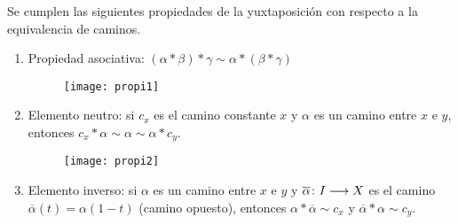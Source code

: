 \documentclass[GTS.tex]{subfiles}
\begin{document}
\begin{prop} Se cumplen las siguientes propiedades de la yuxtaposición con respecto a la equivalencia de caminos.
\begin{enumerate}
\item Propiedad asociativa: $(\alpha*\beta)*\gamma\sim\alpha*(\beta*\gamma)$
\begin{figure}[h!]
	\centering
	\texttt{[image: propi1]}
\end{figure}

\item Elemento neutro: si $c_x$ es el camino constante $x$ y $\alpha$ es un camino entre $x$ e $y$, entonces $c_x*\alpha\sim\alpha\sim\alpha*c_y$.
\begin{figure}[h!]
	\centering
	\texttt{[image: propi2]}
\end{figure}
\item Elemento inverso: si $\alpha$ es un camino entre $x$ e $y$ y $\overline{\alpha}\colon{I}\longrightarrow{X}$ es el camino $\overline{\alpha}(t)=\alpha(1-t)$ (camino opuesto), entonces $\alpha*\overline{\alpha}\sim c_x$ y $\overline{\alpha}*\alpha\sim c_y$.
\end{enumerate}
\end{prop}

\vspace{1cm}
\end{document}

